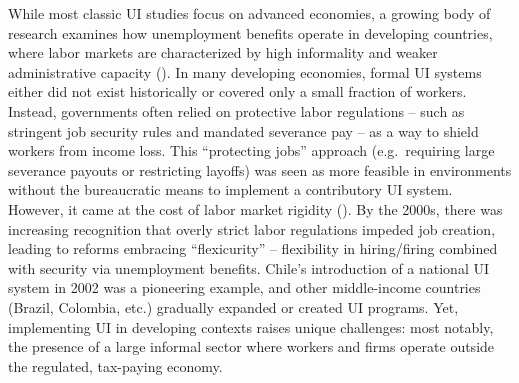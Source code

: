 \documentclass[
  4pt,
]{report}
\begin{document}
While most classic UI studies focus on advanced economies, a growing
body of research examines how unemployment benefits operate in
developing countries, where labor markets are characterized by high
informality and weaker administrative capacity (). In many developing economies, formal UI systems
either did not exist historically or covered only a small fraction of
workers. Instead, governments often relied on protective labor
regulations -- such as stringent job security rules and mandated
severance pay -- as a way to shield workers from income loss. This
``protecting jobs'' approach (e.g.~requiring large severance payouts or
restricting layoffs) was seen as more feasible in environments without
the bureaucratic means to implement a contributory UI system. However,
it came at the cost of labor market rigidity
(). By the
2000s, there was increasing recognition that overly strict labor
regulations impeded job creation, leading to reforms embracing
``flexicurity'' -- flexibility in hiring/firing combined with security
via unemployment benefits. Chile's introduction of a national UI system
in 2002 was a pioneering example, and other middle-income countries
(Brazil, Colombia, etc.) gradually expanded or created UI programs. Yet,
implementing UI in developing contexts raises unique challenges: most
notably, the presence of a large informal sector where workers and firms
operate outside the regulated, tax-paying economy.
\end{document}
